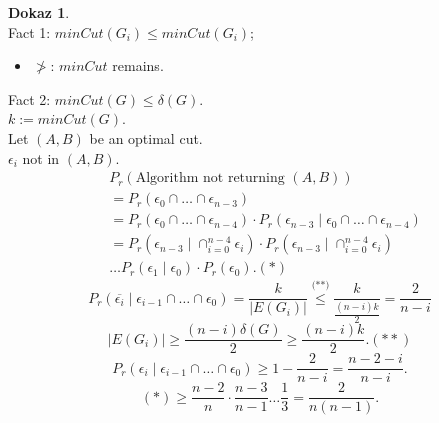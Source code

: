 \documentclass[a4paper, 12pt]{book}
\theoremstyle{definition}
\newtheorem{pro}[counter]{Dokaz}
\theoremstyle{remark}
\begin{document}
\begin{pro} \text{} \\
  Fact 1: $minCut(G_i) \leq minCut(G_i)$;
  \begin{itemize}[label={}]
    \item $\ngtr$: $minCut$ remains.
  \end{itemize}
  Fact 2: $minCut(G) \leq \delta(G)$. \\
  $k := minCut(G)$. \\
  Let $(A,B)$ be an optimal cut. \\
  $\epsilon_i$ not in $(A,B)$.
  \begin{align}
    &P_r(\text{Algorithm not returning } (A,B)) \nonumber \\
    &= P_r(\epsilon_0 \cap \dots \cap \epsilon_{n-3}) \nonumber  \\
    &= P_r(\epsilon_0 \cap \dots \cap \epsilon_{n-4}) \cdot
      P_r(\epsilon_{n-3} \mid \epsilon_0 \cap \dots \cap \epsilon_{n-4}) \nonumber  \\
    &= P_r(\epsilon_{n-3} \mid \cap_{i=0}^{n-4} \epsilon_i) \cdot
      P_r(\epsilon_{n-3} \mid \cap_{i=0}^{n-4} \epsilon_i) \nonumber \\
    &\dots P_r(\epsilon_1 \mid \epsilon_0) \cdot P_r(\epsilon_0). (*) %
  \end{align}
  \begin{equation*}
    P_r(\overline{\epsilon_i} \mid \epsilon_{i-1} \cap \dots \cap \epsilon_0) =
      \frac{k}{|E(G_i)|} \stackrel{\text{(**)}}{\leq} \frac{k}{\frac{(n-i)k}{2}} = \frac{2}{n-i}
  \end{equation*}
  \begin{equation}
    |E(G_i)| \geq \frac{(n-i) \delta(G)}{2} \geq \frac{(n-i)k}{2}. (**) %
  \end{equation}
  \begin{equation*}
    P_r(\epsilon_i \mid \epsilon_{i-1} \cap \dots \cap \epsilon_0) \geq 1 - \frac{2}{n-i} = \frac{n-2-i}{n-i}.
  \end{equation*}
  \begin{equation*}
    (*) \geq \frac{n-2}{n} \cdot \frac{n-3}{n-1} \dots \frac{1}{3} = \frac{2}{n(n-1)}.
  \end{equation*}
\end{pro}
\end{document}
